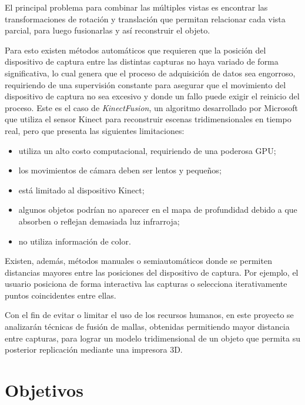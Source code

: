 	El principal problema para combinar las múltiples vistas es
	encontrar las transformaciones de rotación y translación que permitan
	relacionar cada vista parcial, para luego fusionarlas y así reconstruir el objeto.
	

	Para esto existen métodos automáticos que requieren que la posición del dispositivo de captura
	entre las distintas capturas no haya variado de forma significativa\cite{regBesl92},
	lo cual genera que el proceso de adquisición de datos sea engorroso,
	requiriendo de una supervisión constante para asegurar que el movimiento del dispositivo de captura no sea excesivo
	y donde un fallo puede exigir el reinicio del proceso.
	Este es el caso de \emph{KinectFusion}, un algoritmo desarrollado por Microsoft que utiliza el sensor Kinect para reconstruir escenas tridimensionales en tiempo real,
	pero que presenta las siguientes limitaciones:
	\begin{itemize}
		\item utiliza un alto costo computacional, requiriendo de una poderosa GPU;
		\item los movimientos de cámara deben ser lentos y pequeños;
		\item está limitado al dispositivo Kinect;
		\item algunos objetos podrían no aparecer en el mapa de profundidad debido a que absorben o reflejan demasiada luz infrarroja;
		\item no utiliza información de color.\cite{real-time-3d-reconstruction-using-a-kinect-sensor}
	\end{itemize}

	Existen, además, métodos manuales o semiautomáticos donde se permiten distancias mayores entre las posiciones del dispositivo de captura.
	Por ejemplo, el usuario posiciona de forma interactiva las capturas\cite{Turk:1994:ZPM:192161.192241}
	o selecciona iterativamente puntos coincidentes entre ellas\cite{LocalChapterEvents:ItalChap:ItalianChapConf2008:129-136}.

	Con el fin de evitar o limitar el uso de los recursos humanos,
	en este proyecto se analizarán técnicas de fusión de mallas,
	obtenidas permitiendo mayor distancia entre capturas,
	para lograr un modelo tridimensional de un objeto que permita su posterior replicación
	mediante una impresora 3D.



	\section{Objetivos}
